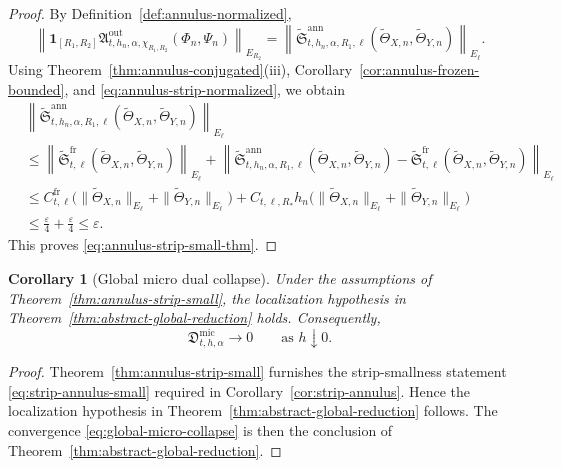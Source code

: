\documentclass[11pt,a4paper]{amsart}
\theoremstyle{plain}
\newtheorem{corollary}[theorem]{Corollary}
\theoremstyle{definition}
\theoremstyle{remark}
\newcommand{\one}{\mathbf 1}
\begin{document}
\begin{proof}
By Definition~\ref{def:annulus-normalized},
\[
\left\|
\one_{[R_1,R_2]}
\mathfrak A_{t,h_n,\alpha,\chi_{R_1,R_2}}^{\mathrm{out}}(\Phi_n,\Psi_n)
\right\|_{E_{R_2}}
=
\left\|
\widetilde{\mathfrak S}_{t,h_n,\alpha,R_1,\ell}^{\mathrm{ann}}
(\widetilde\Theta_{X,n},\widetilde\Theta_{Y,n})
\right\|_{E_\ell}.
\]
Using Theorem~\ref{thm:annulus-conjugated}(iii),
Corollary~\ref{cor:annulus-frozen-bounded}, and \eqref{eq:annulus-strip-normalized}, we obtain
\begin{align*}
&\left\|
\widetilde{\mathfrak S}_{t,h_n,\alpha,R_1,\ell}^{\mathrm{ann}}
(\widetilde\Theta_{X,n},\widetilde\Theta_{Y,n})
\right\|_{E_\ell}\\
&\le
\left\|
\widetilde{\mathfrak S}_{t,\ell}^{\mathrm{fr}}
(\widetilde\Theta_{X,n},\widetilde\Theta_{Y,n})
\right\|_{E_\ell}
+
\left\|
\widetilde{\mathfrak S}_{t,h_n,\alpha,R_1,\ell}^{\mathrm{ann}}
(\widetilde\Theta_{X,n},\widetilde\Theta_{Y,n})
-
\widetilde{\mathfrak S}_{t,\ell}^{\mathrm{fr}}
(\widetilde\Theta_{X,n},\widetilde\Theta_{Y,n})
\right\|_{E_\ell}\\
&\le
C_{t,\ell}^{\mathrm{fr}}
\bigl(
\|\widetilde\Theta_{X,n}\|_{E_\ell}
+
\|\widetilde\Theta_{Y,n}\|_{E_\ell}
\bigr)
+
C_{t,\ell,R_*}h_n
\bigl(
\|\widetilde\Theta_{X,n}\|_{E_\ell}
+
\|\widetilde\Theta_{Y,n}\|_{E_\ell}
\bigr)\\
&\le
\frac{\varepsilon}{4}
+
\frac{\varepsilon}{4}
\le
\varepsilon.
\end{align*}
This proves \eqref{eq:annulus-strip-small-thm}.
\end{proof}

\begin{corollary}[Global micro dual collapse]
\label{cor:global-collapse}
Under the assumptions of Theorem~\ref{thm:annulus-strip-small}, the localization hypothesis in
Theorem~\ref{thm:abstract-global-reduction} holds. Consequently,
\begin{equation}\label{eq:global-micro-collapse}
\mathfrak D_{t,h,\alpha}^{\mathrm{mic}}\longrightarrow0
\qquad\text{as }h\downarrow0.
\end{equation}
\end{corollary}

\begin{proof}
Theorem~\ref{thm:annulus-strip-small} furnishes the strip-smallness statement
\eqref{eq:strip-annulus-small} required in Corollary~\ref{cor:strip-annulus}. Hence the
localization hypothesis in Theorem~\ref{thm:abstract-global-reduction} follows. The convergence
\eqref{eq:global-micro-collapse} is then the conclusion of
Theorem~\ref{thm:abstract-global-reduction}.
\end{proof}
\end{document}
